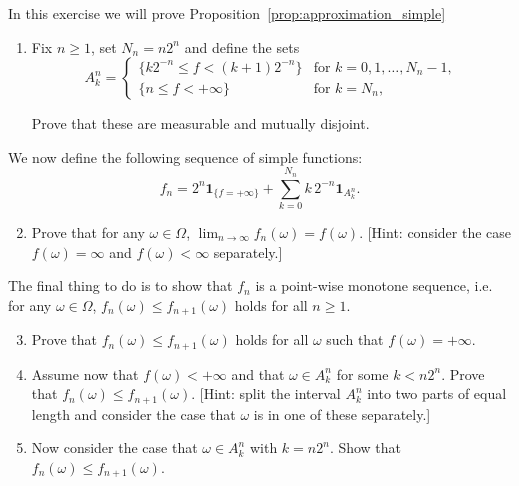 \begin{problem}\label{prb:approximation_simple}
In this exercise we will prove Proposition~\ref{prop:approximation_simple}

\begin{enumerate}[label=(\alph*)]
\item Fix $n \ge 1$, set $N_n = n 2^n$ and define the sets
\[
	A_k^n = \begin{cases}
		\{ k 2^{-n} \le f < (k+1) 2^{-n}\} &\text{for } k = 0,1, \dots, N_n - 1,\\
		\{ n \le f < +\infty\} &\text{for } k = N_n,
	\end{cases}
\]

Prove that these are measurable and mutually disjoint.
\end{enumerate}

We now define the following sequence of simple functions:
\[
	f_n = 2^n\mathbf{1}_{\{f=+\infty\}} + \sum_{k=0}^{N_n} k \, 2^{-n} \mathbf{1}_{A_k^n}.
\]

\begin{enumerate}[label=(\alph*)]
\setcounter{enumi}{1}
\item Prove that for any $\omega \in \Omega$, $\lim_{n \to \infty} f_n(\omega) = f(\omega)$. [Hint: consider the case $f(\omega) = \infty$ and $f(\omega) < \infty$ separately.]
\end{enumerate}

The final thing to do is to show that $f_n$ is a point-wise monotone sequence, i.e. for any $\omega \in \Omega$, $f_n(\omega) \le f_{n+1}(\omega)$ holds for all $n \ge 1$.

\begin{enumerate}[label=(\alph*)]
\setcounter{enumi}{2}
\item Prove that $f_n(\omega) \le f_{n+1}(\omega)$ holds for all $\omega$ such that $f(\omega) = +\infty$.
\item Assume now that $f(\omega) < +\infty$ and that $\omega \in A_k^n$ for some $k < n 2^n$. Prove that $f_n(\omega) \le f_{n+1}(\omega)$. [Hint: split the interval $A_k^n$ into two parts of equal length and consider the case that $\omega$ is in one of these separately.]
\item Now consider the case that $\omega \in A_k^n$ with $k = n 2^n$. Show that $f_n(\omega) \le f_{n+1}(\omega)$.
\end{enumerate}

%
%
%


\end{problem}
